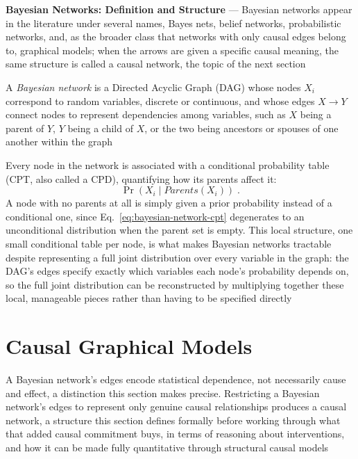 \textbf{Bayesian Networks: Definition and Structure} --- Bayesian networks
appear in the literature under several names, Bayes nets, belief networks,
probabilistic networks, and, as the broader class that networks with only
causal edges belong to, graphical models; when the arrows are given a
specific causal meaning, the same structure is called a causal network,
the topic of the next section
\begin{definition}
  A \emph{Bayesian network} is a Directed Acyclic Graph (DAG) whose nodes
  $X_i$ correspond to random variables, discrete or continuous, and whose
  edges $X \to Y$ connect nodes to represent dependencies among variables,
  such as $X$ being a parent of $Y$, $Y$ being a child of $X$, or the two
  being ancestors or spouses of one another within the graph
\end{definition}
Every node in the network is associated with a conditional probability
table (CPT, also called a CPD), quantifying how its parents affect it:
\begin{equation}
  \label{eq:bayesian-network-cpt}
  \Pr(X_i \mid Parents(X_i))\;.
\end{equation}
A node with no parents at all is simply given a prior probability instead
of a conditional one, since Eq.~\eqref{eq:bayesian-network-cpt} degenerates
to an unconditional distribution when the parent set is empty. This local
structure, one small conditional table per node, is what makes Bayesian
networks tractable despite representing a full joint distribution over
every variable in the graph: the DAG's edges specify exactly which
variables each node's probability depends on, so the full joint
distribution can be reconstructed by multiplying together these local,
manageable pieces rather than having to be specified directly

\section{Causal Graphical Models}
\label{sec:causal-graphical-models-kr}

A Bayesian network's edges encode statistical dependence, not necessarily
cause and effect, a distinction this section makes precise. Restricting a
Bayesian network's edges to represent only genuine causal relationships
produces a causal network, a structure this section defines formally
before working through what that added causal commitment buys, in terms of
reasoning about interventions, and how it can be made fully quantitative
through structural causal models


